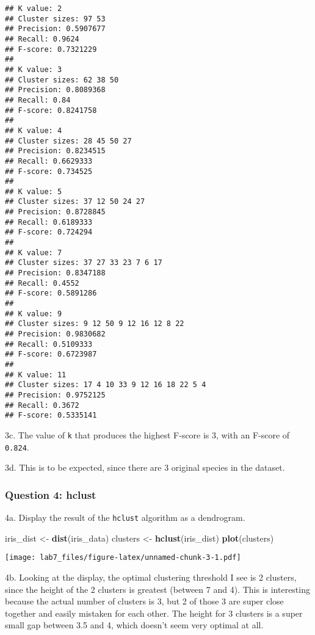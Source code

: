 \documentclass[]{article}
\newenvironment{Shaded}{\begin{snugshade}}{\end{snugshade}}
\newcommand{\KeywordTok}[1]{\textcolor[rgb]{0.13,0.29,0.53}{\textbf{#1}}}
\newcommand{\StringTok}[1]{\textcolor[rgb]{0.31,0.60,0.02}{#1}}
\newcommand{\NormalTok}[1]{#1}
\begin{document}
\begin{verbatim}
## K value: 2
## Cluster sizes: 97 53
## Precision: 0.5907677
## Recall: 0.9624
## F-score: 0.7321229
## 
## K value: 3
## Cluster sizes: 62 38 50
## Precision: 0.8089368
## Recall: 0.84
## F-score: 0.8241758
## 
## K value: 4
## Cluster sizes: 28 45 50 27
## Precision: 0.8234515
## Recall: 0.6629333
## F-score: 0.734525
## 
## K value: 5
## Cluster sizes: 37 12 50 24 27
## Precision: 0.8728845
## Recall: 0.6189333
## F-score: 0.724294
## 
## K value: 7
## Cluster sizes: 37 27 33 23 7 6 17
## Precision: 0.8347188
## Recall: 0.4552
## F-score: 0.5891286
## 
## K value: 9
## Cluster sizes: 9 12 50 9 12 16 12 8 22
## Precision: 0.9830682
## Recall: 0.5109333
## F-score: 0.6723987
## 
## K value: 11
## Cluster sizes: 17 4 10 33 9 12 16 18 22 5 4
## Precision: 0.9752125
## Recall: 0.3672
## F-score: 0.5335141
\end{verbatim}

3c. The value of \texttt{k} that produces the highest F-score is 3, with
an F-score of \texttt{0.824}.

3d. This is to be expected, since there are 3 original species in the
dataset.

\subsubsection{Question 4: hclust}\label{question-4-hclust}

4a. Display the result of the \texttt{hclust} algorithm as a dendrogram.

\begin{Shaded}
\begin{Highlighting}[]
\NormalTok{iris_dist <-}\StringTok{ }\KeywordTok{dist}\NormalTok{(iris_data)}
\NormalTok{clusters <-}\StringTok{ }\KeywordTok{hclust}\NormalTok{(iris_dist)}
\KeywordTok{plot}\NormalTok{(clusters)}
\end{Highlighting}
\end{Shaded}

\texttt{[image: lab7\_files/figure-latex/unnamed-chunk-3-1.pdf]}

4b. Looking at the display, the optimal clustering threshold I see is 2
clusters, since the height of the 2 clusters is greatest (between 7 and
4). This is interesting because the actual number of clusters is 3, but
2 of those 3 are super close together and easily mistaken for each
other. The height for 3 clusters is a super small gap between 3.5 and 4,
which doesn't seem very optimal at all.
\end{document}
